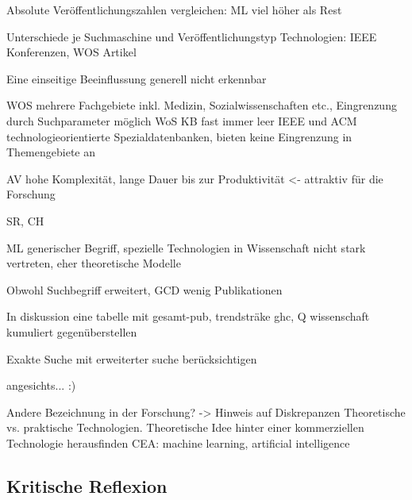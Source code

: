 Absolute Veröffentlichungszahlen vergleichen: ML viel höher als Rest


Unterschiede je Suchmaschine und Veröffentlichungstyp
Technologien: IEEE Konferenzen, WOS Artikel

Eine einseitige Beeinflussung generell nicht erkennbar

WOS mehrere Fachgebiete inkl. Medizin, Sozialwissenschaften etc., Eingrenzung durch Suchparameter möglich
WoS KB fast immer leer
IEEE und ACM technologieorientierte Spezialdatenbanken, bieten keine Eingrenzung in Themengebiete an

AV hohe Komplexität, lange Dauer bis zur Produktivität <- attraktiv für die Forschung

SR, CH

ML generischer Begriff, spezielle Technologien in Wissenschaft nicht stark vertreten, eher theoretische Modelle

Obwohl Suchbegriff erweitert, GCD wenig Publikationen

In diskussion eine tabelle mit gesamt-pub, trendsträke ghc, Q wissenschaft kumuliert gegenüberstellen

Exakte Suche mit erweiterter suche berücksichtigen

angesichts... :)

Andere Bezeichnung in der Forschung? -> Hinweis auf Diskrepanzen
Theoretische vs. praktische Technologien. Theoretische Idee hinter einer kommerziellen Technologie herausfinden
CEA: machine learning, artificial intelligence
\subsection{Kritische Reflexion}
